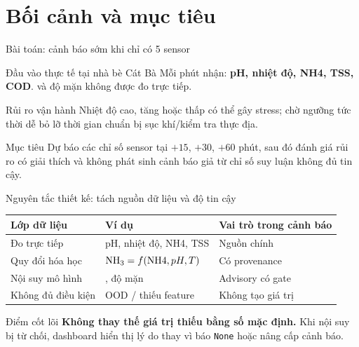 \section{Bối cảnh và mục tiêu}

\begin{frame}{Bài toán: cảnh báo sớm khi chỉ có 5 sensor}
  \begin{block}{Đầu vào thực tế tại nhà bè Cát Bà}
    Mỗi phút nhận: \textbf{pH, nhiệt độ, NH4, TSS, COD}.\newline
    \DO{} và độ mặn không được đo trực tiếp.
  \end{block}
  \begin{alertblock}{Rủi ro vận hành}
    Nhiệt độ cao, \NH{} tăng hoặc \DO{} thấp có thể gây stress; chờ ngưỡng tức thời
    dễ bỏ lỡ thời gian chuẩn bị sục khí/kiểm tra thực địa.
  \end{alertblock}
  \begin{exampleblock}{Mục tiêu}
    Dự báo các chỉ số sensor tại $+15$, $+30$, $+60$ phút, sau đó đánh giá rủi ro
    có giải thích và không phát sinh cảnh báo giả từ chỉ số suy luận không đủ tin cậy.
  \end{exampleblock}
\end{frame}

\begin{frame}{Nguyên tắc thiết kế: tách nguồn dữ liệu và độ tin cậy}
  \begin{center}
  \begin{tabular}{lll}
    \toprule
    Lớp dữ liệu & Ví dụ & Vai trò trong cảnh báo \\
    \midrule
    Đo trực tiếp & pH, nhiệt độ, NH4, TSS & Nguồn chính \\
    Quy đổi hóa học & $\mathrm{NH_3} = f(\mathrm{NH4}, pH, T)$ & Có provenance \\
    Nội suy mô hình & \DO{}, độ mặn & Advisory có gate \\
    Không đủ điều kiện & OOD / thiếu feature & Không tạo giá trị \\
    \bottomrule
  \end{tabular}
  \end{center}
  \vspace{0.5em}
  \begin{alertblock}{Điểm cốt lõi}
    \textbf{Không thay thế giá trị thiếu bằng số mặc định.} Khi nội suy bị từ chối,
    dashboard hiển thị lý do thay vì báo \texttt{None} hoặc nâng cấp cảnh báo.
  \end{alertblock}
\end{frame}

